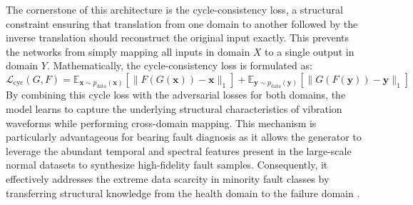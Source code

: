 The cornerstone of this architecture is the cycle-consistency loss, a structural constraint ensuring that translation from one domain to another followed by the inverse translation should reconstruct the original input exactly. This prevents the networks from simply mapping all inputs in domain $X$ to a single output in domain $Y$. Mathematically, the cycle-consistency loss is formulated as:
\begin{equation}
\mathcal{L}_{\text{cyc}}(G, F) = \mathbb{E}_{\boldsymbol{x} \sim p_{\text{data}}(\boldsymbol{x})} [\|F(G(\boldsymbol{x})) - \boldsymbol{x}\|_1] + \mathbb{E}_{\boldsymbol{y} \sim p_{\text{data}}(\boldsymbol{y})} [\|G(F(\boldsymbol{y})) - \boldsymbol{y}\|_1]
\end{equation}
By combining this cycle loss with the adversarial losses for both domains, the model learns to capture the underlying structural characteristics of vibration waveforms while performing cross-domain mapping. This mechanism is particularly advantageous for bearing fault diagnosis as it allows the generator to leverage the abundant temporal and spectral features present in the large-scale normal datasets to synthesize high-fidelity fault samples. Consequently, it effectively addresses the extreme data scarcity in minority fault classes by transferring structural knowledge from the health domain to the failure domain \cite{fernandez2022cyclegan_bearing, alotaibi2021cyclegan_signal, zhu2017cyclegan}.

